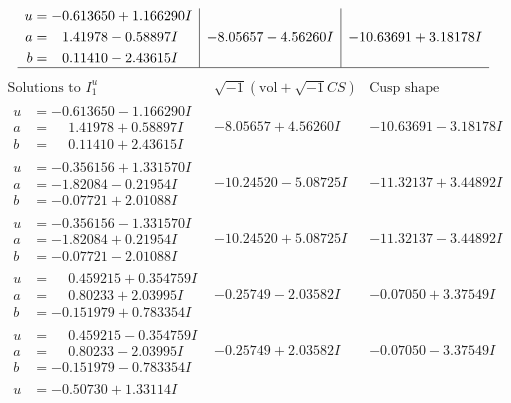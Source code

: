 \documentclass[1p]{elsarticle_modified}
\theoremstyle{definition}
\newcommand{\I}{\sqrt{-1}}
\begin{document}
$$\begin{array}{c|c|c}
\begin{aligned}
u &= -0.613650 + 1.166290 I \\
a &= \phantom{-}1.41978 - 0.58897 I \\
b &= \phantom{-}0.11410 - 2.43615 I\end{aligned}
 & -8.05657 - 4.56260 I & -10.63691 + 3.18178 I\\
 \hline 
 \end{array}$$\newpage$$\begin{array}{c|c|c}  
\text{Solutions to }I^u_{1}& \I (\text{vol} + \sqrt{-1}CS) & \text{Cusp shape}\\
 \hline 
\begin{aligned}
u &= -0.613650 - 1.166290 I \\
a &= \phantom{-}1.41978 + 0.58897 I \\
b &= \phantom{-}0.11410 + 2.43615 I\end{aligned}
 & -8.05657 + 4.56260 I & -10.63691 - 3.18178 I \\ \hline\begin{aligned}
u &= -0.356156 + 1.331570 I \\
a &= -1.82084 - 0.21954 I \\
b &= -0.07721 + 2.01088 I\end{aligned}
 & -10.24520 - 5.08725 I & -11.32137 + 3.44892 I \\ \hline\begin{aligned}
u &= -0.356156 - 1.331570 I \\
a &= -1.82084 + 0.21954 I \\
b &= -0.07721 - 2.01088 I\end{aligned}
 & -10.24520 + 5.08725 I & -11.32137 - 3.44892 I \\ \hline\begin{aligned}
u &= \phantom{-}0.459215 + 0.354759 I \\
a &= \phantom{-}0.80233 + 2.03995 I \\
b &= -0.151979 + 0.783354 I\end{aligned}
 & -0.25749 - 2.03582 I & -0.07050 + 3.37549 I \\ \hline\begin{aligned}
u &= \phantom{-}0.459215 - 0.354759 I \\
a &= \phantom{-}0.80233 - 2.03995 I \\
b &= -0.151979 - 0.783354 I\end{aligned}
 & -0.25749 + 2.03582 I & -0.07050 - 3.37549 I \\ \hline\begin{aligned}
u &= -0.50730 + 1.33114 I \\

\end{aligned}
\end{array}$$
\end{document}
